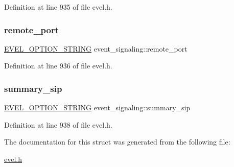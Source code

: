 Definition at line 935 of file evel.\+h.

\hypertarget{structevent__signaling_ab8971e59fbf1c299b8e65f3f0a60f63e}{}\label{structevent__signaling_ab8971e59fbf1c299b8e65f3f0a60f63e} 
\subsubsection{\texorpdfstring{remote\+\_\+port}{remote\_port}}
{\footnotesize\ttfamily \hyperlink{evel_8h_a0de5113a7b72de93c0c7b644f7ea7ec3}{E\+V\+E\+L\+\_\+\+O\+P\+T\+I\+O\+N\+\_\+\+S\+T\+R\+I\+NG} event\+\_\+signaling\+::remote\+\_\+port}



Definition at line 936 of file evel.\+h.

\hypertarget{structevent__signaling_a47b6337540003f1cd24ba4a05b514fa0}{}\label{structevent__signaling_a47b6337540003f1cd24ba4a05b514fa0} 
\subsubsection{\texorpdfstring{summary\+\_\+sip}{summary\_sip}}
{\footnotesize\ttfamily \hyperlink{evel_8h_a0de5113a7b72de93c0c7b644f7ea7ec3}{E\+V\+E\+L\+\_\+\+O\+P\+T\+I\+O\+N\+\_\+\+S\+T\+R\+I\+NG} event\+\_\+signaling\+::summary\+\_\+sip}



Definition at line 938 of file evel.\+h.



The documentation for this struct was generated from the following file\+:\begin{DoxyCompactItemize}
\item 
\hyperlink{evel_8h}{evel.\+h}\end{DoxyCompactItemize}

